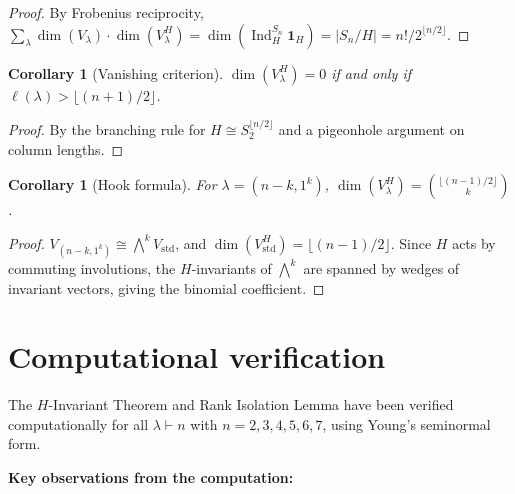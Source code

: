 \documentclass[12pt]{article}
\newtheorem{corollary}[theorem]{Corollary}
\theoremstyle{definition}
\theoremstyle{remark}
\begin{document}
\begin{proof}
By Frobenius reciprocity,
$\sum_\lambda \dim(V_\lambda) \cdot \dim(V_\lambda^H)
= \dim(\operatorname{Ind}_H^{S_n} \mathbf{1}_H)
= |S_n/H| = n!/2^{\lfloor n/2 \rfloor}$.
\end{proof}

\begin{corollary}[Vanishing criterion]
$\dim(V_\lambda^H) = 0$ if and only if $\ell(\lambda) > \lfloor(n+1)/2\rfloor$.
\end{corollary}

\begin{proof}
By the branching rule for $H \cong S_2^{\lfloor n/2 \rfloor}$ and a pigeonhole
argument on column lengths.
\end{proof}

\begin{corollary}[Hook formula]
For $\lambda = (n-k, 1^k)$,
$\dim(V_\lambda^H) = \binom{\lfloor(n-1)/2\rfloor}{k}$.
\end{corollary}

\begin{proof}
$V_{(n-k,1^k)} \cong \bigwedge^k V_{\mathrm{std}}$, and
$\dim(V_{\mathrm{std}}^H) = \lfloor(n-1)/2\rfloor$.  Since $H$ acts by commuting
involutions, the $H$-invariants of $\bigwedge^k$ are spanned by wedges of invariant
vectors, giving the binomial coefficient.
\end{proof}

\section{Computational verification}

The $H$-Invariant Theorem and Rank Isolation Lemma have been verified computationally
for all $\lambda \vdash n$ with $n = 2, 3, 4, 5, 6, 7$, using Young's seminormal
form.

\medskip
\noindent\textbf{Key observations from the computation:}
\end{document}
